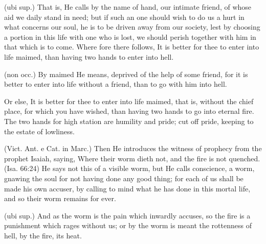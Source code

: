  (ubi sup.) That is, He calls by the name of hand, our intimate friend, of whose aid we daily stand in need; but if such an one should wish to do us a hurt in what concerns our soul, he is to be driven away from our society, lest by choosing a portion in this life with one who is lost, we should perish together with him in that which is to come. Where fore there follows, It is better for thee to enter into life maimed, than having two hands to enter into hell.

 (non occ.) By maimed He means, deprived of the help of some friend, for it is better to enter into life without a friend, than to go with him into hell.

 Or else, It is better for thee to enter into life maimed, that is, without the chief place, for which you have wished, than having two hands to go into eternal fire. The two hands for high station are humility and pride; cut off pride, keeping to the estate of lowliness.

 (Vict. Ant. e Cat. in Marc.) Then He introduces the witness of prophecy from the prophet Isaiah, saying, Where their worm dieth not, and the fire is not quenched. (Isa. 66:24) He says not this of a visible worm, but He calls conscience, a worm, gnawing the soul for not having done any good thing; for each of us shall be made his own accuser, by calling to mind what he has done in this mortal life, and so their worm remains for ever.

 (ubi sup.) And as the worm is the pain which inwardly accuses, so the fire is a punishment which rages without us; or by the worm is meant the rottenness of hell, by the fire, its heat.


